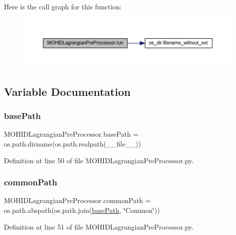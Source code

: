 Here is the call graph for this function\+:\nopagebreak
\begin{figure}[H]
\begin{center}
\leavevmode
\includegraphics[width=350pt]{namespace_m_o_h_i_d_lagrangian_pre_processor_a0e4b5abe6bc6cf76f0ed898743e538f3_cgraph}
\end{center}
\end{figure}


\subsection{Variable Documentation}
\mbox{\label{namespace_m_o_h_i_d_lagrangian_pre_processor_ac4a3b30ba4c365ff9860cd0a3fef33f9}} 
\subsubsection{\texorpdfstring{base\+Path}{basePath}}
{\footnotesize\ttfamily M\+O\+H\+I\+D\+Lagrangian\+Pre\+Processor.\+base\+Path = os.\+path.\+dirname(os.\+path.\+realpath(\+\_\+\+\_\+file\+\_\+\+\_\+))}



Definition at line 50 of file M\+O\+H\+I\+D\+Lagrangian\+Pre\+Processor.\+py.

\mbox{\label{namespace_m_o_h_i_d_lagrangian_pre_processor_a376fac9ba04258bdbbe80e19173a7244}} 
\subsubsection{\texorpdfstring{common\+Path}{commonPath}}
{\footnotesize\ttfamily M\+O\+H\+I\+D\+Lagrangian\+Pre\+Processor.\+common\+Path = os.\+path.\+abspath(os.\+path.\+join(\mbox{\hyperlink{namespace_m_o_h_i_d_lagrangian_pre_processor_ac4a3b30ba4c365ff9860cd0a3fef33f9}{base\+Path}}, \char`\"{}Common\char`\"{}))}



Definition at line 51 of file M\+O\+H\+I\+D\+Lagrangian\+Pre\+Processor.\+py.

